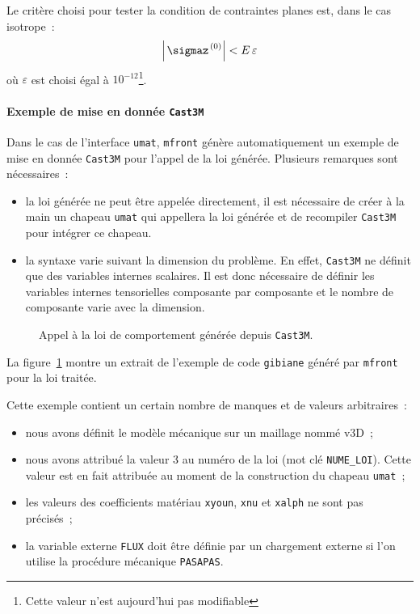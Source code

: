 \documentclass[rectoverso,pleiades,pstricks,leqno,anti]{texmf/note_technique_2010}
\newcommand{\mfront}{\texttt{mfront}}
\newcommand{\castem}{\texttt{Cast3M}}
\newcommand{\code}[1]{
  \psframebox[linecolor=ceaorange,shadow=true,blur=true]{
    \begin{minipage}[htbp]{1.0\linewidth}
      \ttfamily\scriptsize #1
    \end{minipage}
  }
}
\begin{document}
Le critère choisi pour tester la condition de contraintes planes est,
dans le cas isotrope~:
\[
\left|\left.\sigmaz\right.^{(0)}\right|<E\,\varepsilon
\]
où $\varepsilon$ est choisi égal à \(10^{-12}\)\footnote{Cette valeur
  n'est aujourd'hui pas modifiable}.

\paragraph{Exemple de mise en donnée \castem{}} Dans le cas
de l'interface \texttt{umat}, \mfront{} génère automatiquement
un exemple de mise en donnée \castem{} pour l'appel de la loi
générée. Plusieurs remarques sont nécessaires~:
\begin{itemize}
\item la loi générée ne peut être appelée directement, il est
nécessaire de créer à la main un chapeau \texttt{umat} qui
appellera la loi générée et de recompiler \castem{} pour
intégrer ce chapeau.
\item la syntaxe varie suivant la dimension du problème. En
effet, \castem{} ne définit que des variables internes
scalaires. Il est donc nécessaire de définir les variables
internes tensorielles composante par composante et le
nombre de composante varie avec la dimension.
\end{itemize}

\begin{figure}[htbp]
  \centering
  \code{{\ttfamily }}  
  \caption{Appel à la loi de comportement générée depuis \castem{}.}
  \label{fig:mfrontcastem}
\end{figure}

La figure~\ref{fig:mfrontcastem} montre un extrait de
l'exemple de code \texttt{gibiane} généré par \mfront{}
pour la loi traitée.

Cette exemple contient un certain nombre de manques et
de valeurs arbitraires~:
\begin{itemize}
\item nous avons définit le modèle mécanique sur un
  maillage nommé v3D~;
\item nous avons attribué la valeur \(3\) au numéro de
  la loi (mot clé \texttt{NUME\_LOI}). Cette valeur
  est en fait attribuée au moment de la construction
  du chapeau \texttt{umat}~;
\item les valeurs des coefficients matériau \texttt{xyoun},
  \texttt{xnu} et \texttt{xalph} ne sont pas précisés~;
\item la variable externe \texttt{FLUX} doit être définie
  par un chargement externe si l'on utilise la
  procédure mécanique \texttt{PASAPAS}.
\end{itemize}
\end{document}
